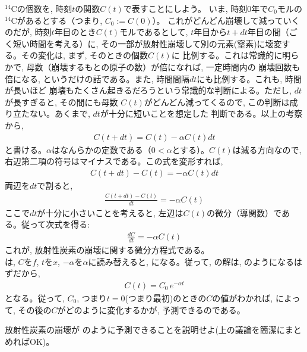 $^{14}$Cの個数を, 時刻$t$の関数$C(t)$で表すことにしよう。
いま, 時刻$0$年で$C_0$モルの$^{14}$Cがあるとする（つまり, $C_0:=C(0)$）。
これがどんどん崩壊して減っていくのだが, 
時刻$t$年目のとき$C(t)$モルであるとして, $t$年目から$t+dt$年目の間（ごく短い時間を考える）に, 
その一部が放射性崩壊して別の元素(窒素)に壊変する。その変化は, まず, そのときの個数$C(t)$に
比例する。これは常識的に明らかで, 母数（崩壊するもとの原子の数）が倍になれば, 一定時間内の
崩壊回数も倍になる, というだけの話である。また, 時間間隔$dt$にも比例する。これも, 時間が長いほど
崩壊もたくさん起きるだろうという常識的な判断による。ただし, $dt$が長すぎると, その間にも母数
$C(t)$がどんどん減ってくるので, この判断は成り立たない。あくまで, $dt$が十分に短いことを想定した
判断である。以上の考察から, 
\begin{eqnarray}
C(t+dt)=C(t)-\alpha C(t) dt
\end{eqnarray}
と書ける。$\alpha$はなんらかの定数である（$0<\alpha$とする）。$C(t)$は減る方向なので, 
右辺第二項の符号はマイナスである。この式を変形すれば, 
\begin{eqnarray}C(t+dt)-C(t)=-\alpha C(t) dt\label{eq:dC_dt_4}\end{eqnarray}
両辺を$dt$で割ると, 
\begin{eqnarray}\frac{C(t+dt)-C(t)}{dt}=-\alpha C(t)\end{eqnarray}
ここで$dt$が十分に小さいことを考えると, 左辺は$C(t)$の微分（導関数）である。従って次式を得る:
\begin{eqnarray}
\frac{dC}{dt}=-\alpha C(t)\label{eq:C14disint1}
\end{eqnarray}
これが, 放射性炭素の崩壊に関する微分方程式である。\\

は, $C$を$f$, $t$を$x$, $-\alpha$を$\alpha$に読み替えると, 
になる。従って, の解は, のようになるはずだから, 
\begin{eqnarray}
C(t)=C_0\,e^{-\alpha t}\label{eq:C14disint3}
\end{eqnarray}
となる。従って, $C_0$, つまり$t=0$(つまり最初)のときの$C$の値がわかれば, 
によって, その後の$C$がどのように変化するかが, 
予測できるのである。\\

\begin{q}\label{q:C14disint} 放射性炭素の崩壊が
のように予測できることを説明せよ(上の議論を簡潔にまとめればOK)。\end{q}

